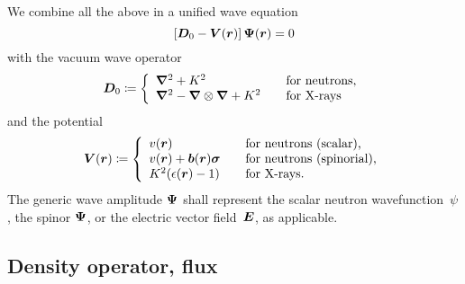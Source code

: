 We combine all the above in a unified wave equation
%
\begin{equation}\label{EWAVE}
  \left[ \TDo - \TV(\r) \right] \v\Psi(\r) = 0
\end{equation}
with the vacuum wave operator
%
%
\begin{equation}\label{EDo}
  \TDo \coloneqq \left\{ \begin{array}{ll}
      \Nabla^2 + K^2                     &\text{~~~for neutrons,}\\
      \Nabla^2 - \Nabla\otimes\Nabla + K^2 &\text{~~~for X-rays}
  \end{array}\right.
\end{equation}
%
and the potential
%
%
\begin{equation}\label{ETV}
  \TV(\r) \coloneqq \left\{ \begin{array}{ll}
      v(\r)                       &\text{~~~for neutrons (scalar),}\\
      v(\r)+\v{b}(\r)\PauliVec    &\text{~~~for neutrons (spinorial),}\\
      K^2(\epsilon(\r)-1)         &\text{~~~for X-rays.}
  \end{array}\right.
\end{equation}
The generic wave amplitude $\bm{\Psi}$
%
shall represent
the scalar neutron wavefunction~$\psi$,
the spinor $\bm{\Psi}$, or the electric vector field~$\bm{E}$, as applicable.

\subsection{Density operator, flux}\label{SdensityMatrix}

